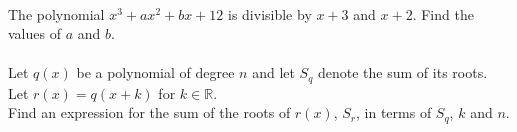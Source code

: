 \documentclass[12pt, a4paper, titlepage, twoside]{article}
\newcommand*{\R}{\mathbb{R}}
\begin{document}
	\paragraph{}
	 The polynomial $x^3 + ax^2 + bx + 12$ is divisible by $x+3$ and $x+2$. Find the values of $a$ and $b$.
	
	\paragraph{}
	 Let $q(x)$ be a polynomial of degree $n$ and let $S_q$ denote the sum of its roots. 
	Let $r(x) = q(x + k)$ for $k \in \R$.\\
	
	Find an expression for the sum of the roots of $r(x)$, $S_r$, in terms of $S_q$, $k$ and $n$.
	
	\newpage
	
\end{document}
